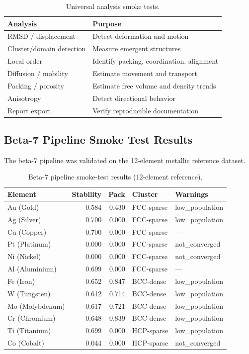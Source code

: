 \documentclass[12pt]{article}
\begin{document}
\begin{table}[H]
\centering
\caption{Universal analysis smoke tests.}
\label{tab:analysis_smoke}
\begin{tabular}{lp{}}
\toprule
\textbf{Analysis} & \textbf{Purpose} \\
\midrule
RMSD / displacement      & Detect deformation and motion \\
Cluster/domain detection & Measure emergent structures \\
Local order              & Identify packing, coordination, alignment \\
Diffusion / mobility     & Estimate movement and transport \\
Packing / porosity       & Estimate free volume and density trends \\
Anisotropy               & Detect directional behavior \\
Report export            & Verify reproducible documentation \\
\bottomrule
\end{tabular}
\end{table}

\subsection{Beta-7 Pipeline Smoke Test Results}

The beta-7 pipeline was validated on the 12-element metallic reference dataset.

\begin{table}[H]
\centering
\caption{Beta-7 pipeline smoke-test results (12-element reference).}
\label{tab:pipeline_smoke}
\begin{tabular}{lrrll}
\toprule
\textbf{Element} & \textbf{Stability} & \textbf{Pack} & \textbf{Cluster} & \textbf{Warnings} \\
\midrule
Au (Gold)        & 0.584 & 0.430 & FCC-sparse & low\_population \\
Ag (Silver)      & 0.700 & 0.000 & FCC-sparse & low\_population \\
Cu (Copper)      & 0.700 & 0.000 & FCC-sparse & --- \\
Pt (Platinum)    & 0.000 & 0.000 & FCC-sparse & not\_converged \\
Ni (Nickel)      & 0.000 & 0.000 & FCC-sparse & not\_converged \\
Al (Aluminium)   & 0.699 & 0.000 & FCC-sparse & --- \\
Fe (Iron)        & 0.652 & 0.847 & BCC-dense  & low\_population \\
W  (Tungsten)    & 0.612 & 0.714 & BCC-dense  & low\_population \\
Mo (Molybdenum)  & 0.617 & 0.721 & BCC-dense  & low\_population \\
Cr (Chromium)    & 0.648 & 0.839 & BCC-dense  & low\_population \\
Ti (Titanium)    & 0.699 & 0.000 & HCP-sparse & low\_population \\
Co (Cobalt)      & 0.044 & 0.000 & HCP-sparse & not\_converged \\
\bottomrule
\end{tabular}
\end{table}
\end{document}

